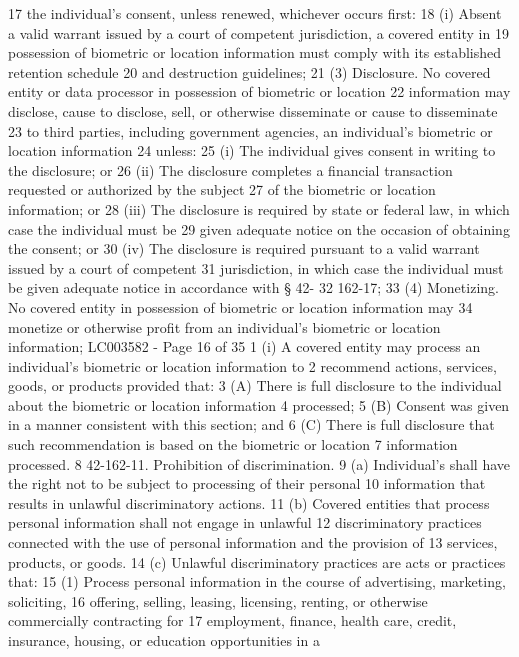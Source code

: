 17 the individual's consent, unless renewed, whichever occurs first:
18 (i) Absent a valid warrant issued by a court of competent jurisdiction, a covered entity in
19 possession of biometric or location information must comply with its established retention schedule
20 and destruction guidelines;
21 (3) Disclosure. No covered entity or data processor in possession of biometric or location
22 information may disclose, cause to disclose, sell, or otherwise disseminate or cause to disseminate
23 to third parties, including government agencies, an individual's biometric or location information
24 unless:
25 (i) The individual gives consent in writing to the disclosure; or
26 (ii) The disclosure completes a financial transaction requested or authorized by the subject
27 of the biometric or location information; or
28 (iii) The disclosure is required by state or federal law, in which case the individual must be
29 given adequate notice on the occasion of obtaining the consent; or
30 (iv) The disclosure is required pursuant to a valid warrant issued by a court of competent
31 jurisdiction, in which case the individual must be given adequate notice in accordance with § 42-
32 162-17;
33 (4) Monetizing. No covered entity in possession of biometric or location information may
34 monetize or otherwise profit from an individual's biometric or location information;
LC003582 - Page 16 of 35
1 (i) A covered entity may process an individual's biometric or location information to
2 recommend actions, services, goods, or products provided that:
3 (A) There is full disclosure to the individual about the biometric or location information
4 processed;
5 (B) Consent was given in a manner consistent with this section; and
6 (C) There is full disclosure that such recommendation is based on the biometric or location
7 information processed.
8 42-162-11. Prohibition of discrimination.
9 (a) Individual's shall have the right not to be subject to processing of their personal
10 information that results in unlawful discriminatory actions.
11 (b) Covered entities that process personal information shall not engage in unlawful
12 discriminatory practices connected with the use of personal information and the provision of
13 services, products, or goods.
14 (c) Unlawful discriminatory practices are acts or practices that:
15 (1) Process personal information in the course of advertising, marketing, soliciting,
16 offering, selling, leasing, licensing, renting, or otherwise commercially contracting for
17 employment, finance, health care, credit, insurance, housing, or education opportunities in a
